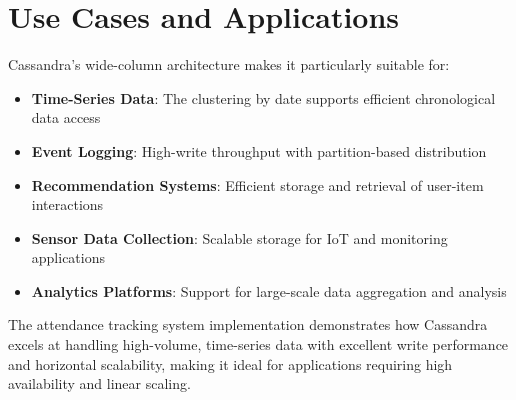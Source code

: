 \section{Use Cases and Applications}

Cassandra's wide-column architecture makes it particularly suitable for:

\begin{itemize}
    \item \textbf{Time-Series Data}: The clustering by date supports efficient chronological data access
    \item \textbf{Event Logging}: High-write throughput with partition-based distribution
    \item \textbf{Recommendation Systems}: Efficient storage and retrieval of user-item interactions
    \item \textbf{Sensor Data Collection}: Scalable storage for IoT and monitoring applications
    \item \textbf{Analytics Platforms}: Support for large-scale data aggregation and analysis
\end{itemize}

The attendance tracking system implementation demonstrates how Cassandra excels at handling high-volume, time-series data with excellent write performance and horizontal scalability, making it ideal for applications requiring high availability and linear scaling.